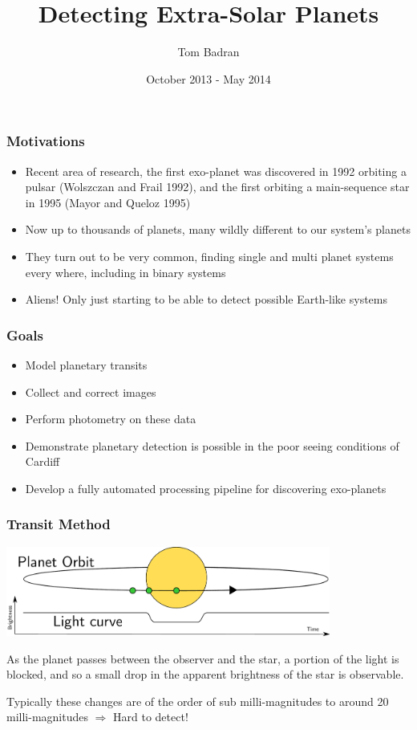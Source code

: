 \documentclass{beamer}
\title{Detecting Extra-Solar Planets}
\author{Tom Badran}
\date{October 2013 - May 2014}
\begin{document}
\frame{\titlepage}
  \begin{frame}
    \frametitle{Motivations}
    \begin{itemize}
        \item Recent area of research, the first exo-planet was discovered in 1992 orbiting a pulsar (Wolszczan and Frail 1992), and the first orbiting a main-sequence star in 1995 (Mayor and Queloz 1995)
        \item Now up to thousands of planets, many wildly different to our system's planets
        \item They turn out to be very common, finding single and multi planet systems every where, including in binary systems
        \item Aliens! Only just starting to be able to detect possible Earth-like systems
    \end{itemize}
  \end{frame}
  \begin{frame}
    \frametitle{Goals}
    \begin{itemize}
        \item Model planetary transits
        \item Collect and correct images
        \item Perform photometry on these data
        \item Demonstrate planetary detection is possible in the poor seeing conditions of Cardiff
        \item Develop a fully automated processing pipeline for discovering exo-planets
    \end{itemize}
  \end{frame}
  \begin{frame}
    \frametitle{Transit Method}
    \begin{center}
    \includegraphics[width=0.8\textwidth]{images/planetary_transit.pdf}
    \end{center}
    As the planet passes between the observer and the star, a portion of the light is blocked, and so a small drop in the apparent brightness of the star is observable.

    Typically these changes are of the order of sub milli-magnitudes to around 20 milli-magnitudes $\Rightarrow$ Hard to detect!
  \end{frame}
\end{document}
